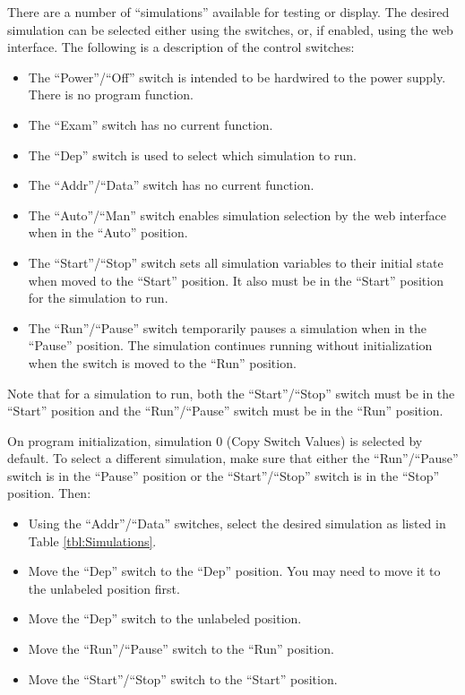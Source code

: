 \documentclass[10pt, openany]{book}
\newcommand{\switch}[2]{``#1''/``#2''}
\newcommand{\position}[1]{``#1''}
\begin{document}
There are a number of ``simulations'' available for testing or display.  The desired simulation can be selected either using the switches, or, if enabled, using the web interface.  The following is a description of the control switches:
\begin{itemize}
  \item The \switch{Power}{Off} switch is intended to be hardwired to the power supply.  There is no program function.
  \item The \position{Exam} switch has no current function.
  \item The \position{Dep} switch is used to select which simulation to run.
  \item The \switch{Addr}{Data} switch has no current function.
  \item The \switch{Auto}{Man} switch enables simulation selection by the web interface when in the \position{Auto} position.
  \item The \switch{Start}{Stop} switch sets all simulation variables to their initial state when moved to the \position{Start} position.  It also must be in the \position{Start} position for the simulation to run.
  \item The \switch{Run}{Pause} switch temporarily pauses a simulation when in the \position{Pause} position.  The simulation continues running without initialization when the switch is moved to the \position{Run} position.
\end{itemize}

Note that for a simulation to run, both the \switch{Start}{Stop} switch must be in the \position{Start} position and the \switch{Run}{Pause} switch must be in the \position{Run} position.

On program initialization, simulation 0 (Copy Switch Values) is selected by default.  To select a different simulation, make sure that either the \switch{Run}{Pause} switch is in the \position{Pause} position or the \switch{Start}{Stop} switch is in the \position{Stop} position.  Then:
\begin{itemize}
  \item Using the \switch{Addr}{Data} switches, select the desired simulation as listed in Table \ref{tbl:Simulations}.
  \item Move the \position{Dep} switch to the \position{Dep} position.  You may need to move it to the unlabeled position first.
  \item Move the \position{Dep} switch to the unlabeled position.
  \item Move the \switch{Run}{Pause} switch to the \position{Run} position.
  \item Move the \switch{Start}{Stop} switch to the \position{Start} position.
\end{itemize}
\end{document}
